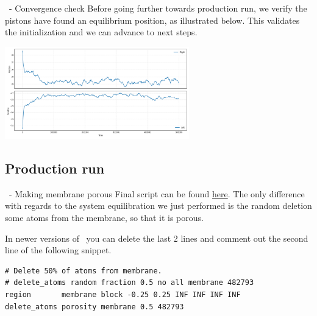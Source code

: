 \begin{frame}[fragile]{\secname}{\subsecname\ - Convergence check}
Before going further towards production run, we verify the pistons have found an equilibrium position, as illustrated below. This validates the initialization and we can advance to next steps.

\vspace{0.5cm}

{%
\hfill
\includegraphics[width=8cm]{media/005-permeable-membrane-piston-position.png}
\hfill
}
\end{frame}

\subsection{Production run}

\begin{frame}[fragile]{\secname}{\subsecname\ - Making membrane porous}
Final script can be found \href{https://github.com/WallyTutor/learning-scientific-computing/blob/main/molecular-dynamics/lammps/tutorials-simon-gravelle/02-Permeable-Membrane/input-step-3.lammps}{here}. The only difference with regards to the system equilibration we just performed is the random deletion some atoms from the membrane, so that it is porous.

\vspace{0.5cm}

In newer versions of \LAMMPS\ you can delete the last 2 lines and comment out the second line of the following snippet.

\vspace{0.5cm}

\begin{lstlisting}[language=LAMMPS,basicstyle=\small]
# Delete 50% of atoms from membrane.
# delete_atoms random fraction 0.5 no all membrane 482793
region       membrane block -0.25 0.25 INF INF INF INF
delete_atoms porosity membrane 0.5 482793
\end{lstlisting}
\end{frame}

